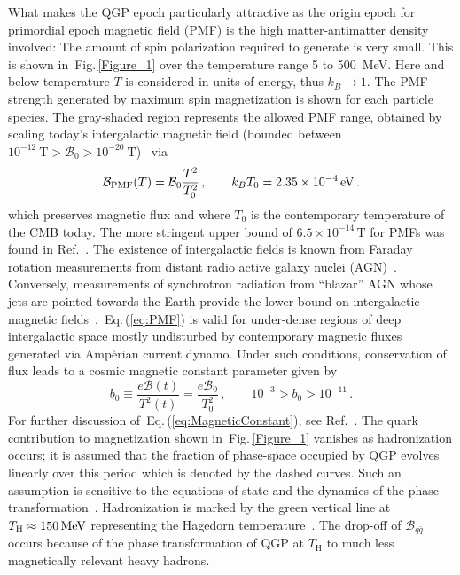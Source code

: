 \documentclass[epjST]{svjour}
\newcommand*{\MeV}{\text{\,MeV}}
\newcommand*{\eV}{\text{\,eV}}
\newcommand{\req}[1]{Eq.\,(\ref{#1})}
\newcommand{\rf}[1]{Fig.\,{\ref{#1}}}
\begin{document}
{\color{blue} What makes the QGP epoch particularly attractive as the origin epoch for primordial epoch magnetic field (PMF)  is the high matter-antimatter density involved: The amount of spin polarization required to generate is very small.} This is shown in~\rf{Figure_1} over the temperature range 5 to 500~MeV. {\color{blue}Here and below temperature $T$ is considered in units of energy, thus \(k_{B}\to 1\).  The PMF strength generated by maximum spin magnetization is shown for each particle species. The gray-shaded region represents the allowed PMF range, obtained by scaling today’s intergalactic magnetic field (bounded between \(10^{-12}~\mathrm{T} > \mathcal{B}_{0} > 10^{-20}~\mathrm{T}\))~\cite{Planck:2015zrl,Jedamzik:2018itu} via
\begin{equation}
\label{eq:PMF}
\mathcal{B}_\mathrm{PMF}(T) = \mathcal{B}_{0}\frac{T^{2}}{T_{0}^{2}}\,,\qquad
k_{B}T_{0} = 2.35\times10^{-4}\eV\,.
\end{equation}
which preserves magnetic flux and where \(T_{0}\) is the contemporary temperature of the CMB today. The more stringent upper bound of \(6.5\times10^{-14}\,\mathrm{T}\) for PMFs was found in Ref.~\cite{Pshirkov:2015tua}. The existence of intergalactic fields is known from Faraday rotation measurements from distant radio active galaxy nuclei (AGN)~\cite{Pomakov:2022cem}. Conversely, measurements of synchrotron radiation from ``blazar'' AGN whose jets are pointed towards the Earth provide the lower bound on intergalactic magnetic fields~\cite{Neronov:2010gir}.~\req{eq:PMF} is valid for under-dense regions of deep intergalactic space mostly undisturbed by contemporary magnetic fluxes generated via Amp{\`e}rian current dynamo. Under such conditions, conservation of flux leads to a cosmic magnetic constant parameter given by
\begin{equation}
\label{eq:MagneticConstant}
b_{0} \equiv \frac{e\mathcal{B}(t)}{T^{2}(t)}=\frac{e\mathcal{B}_{0}}{T_{0}^{2}}\,,\qquad
10^{-3} > b_{0} > 10^{-11}\,.
\end{equation}
For further discussion of~\req{eq:MagneticConstant}, see Ref.~\cite{Steinmetz:2023nsc}. The quark contribution to magnetization shown in~\rf{Figure_1} vanishes as hadronization occurs; it is assumed that the fraction of phase-space occupied by QGP evolves linearly over this period which is denoted by the dashed curves. Such an assumption is sensitive to the equations of state and the dynamics of the phase transformation~\cite{Fromerth:2012fe}.} Hadronization is marked by the green vertical line at \(T_\mathrm{H}\approx150\MeV\) {\color{blue}representing the Hagedorn temperature~\cite{Hagedorn:1967dia,Rafelski:2015xej}.} The drop-off of \(\mathcal{B}_{q\bar{q}}\) occurs because of the phase transformation of QGP at \(T_\mathrm{H}\) to much less magnetically relevant heavy hadrons.
\end{document}
